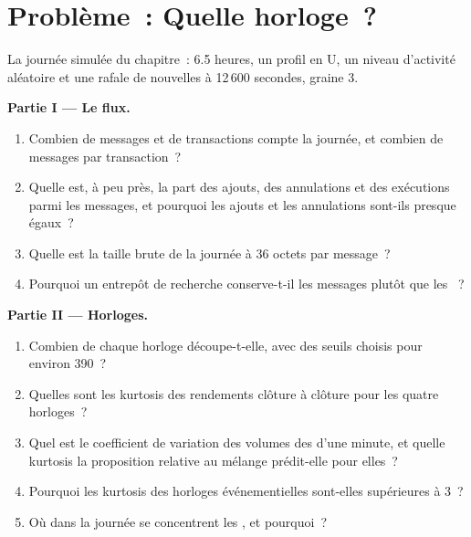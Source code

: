 \section{Problème~: Quelle horloge~?}

\begin{problem}\label{pb:rs:market-data-for-research:1}
La journée simulée du chapitre~: 6.5 heures, un profil en U, un niveau d'activité aléatoire et une rafale de nouvelles à 12\,600 secondes, graine 3.

\medskip\noindent\textbf{Partie I --- Le flux.}
\begin{enumerate}
\item Combien de messages et de transactions compte la journée, et combien de messages par transaction~?
\item Quelle est, à peu près, la part des ajouts, des annulations et des exécutions parmi les messages, et pourquoi les ajouts
et les annulations sont-ils presque égaux~?
\item Quelle est la taille brute de la journée à 36 octets par message~?
\item Pourquoi un entrepôt de recherche conserve-t-il les messages plutôt que les ~?
\end{enumerate}

\medskip\noindent\textbf{Partie II --- Horloges.}
\begin{enumerate}[resume]
\item Combien de  chaque horloge découpe-t-elle, avec des seuils choisis pour environ 390~?
\item Quelles sont les kurtosis des rendements clôture à clôture pour les quatre horloges~?
\item Quel est le coefficient de variation des volumes des  d'une minute, et quelle kurtosis la proposition relative au mélange
prédit-elle pour elles~?
\item Pourquoi les kurtosis des horloges événementielles sont-elles supérieures à 3~?
\item Où dans la journée se concentrent les , et pourquoi~?
\end{enumerate}


\end{problem}
